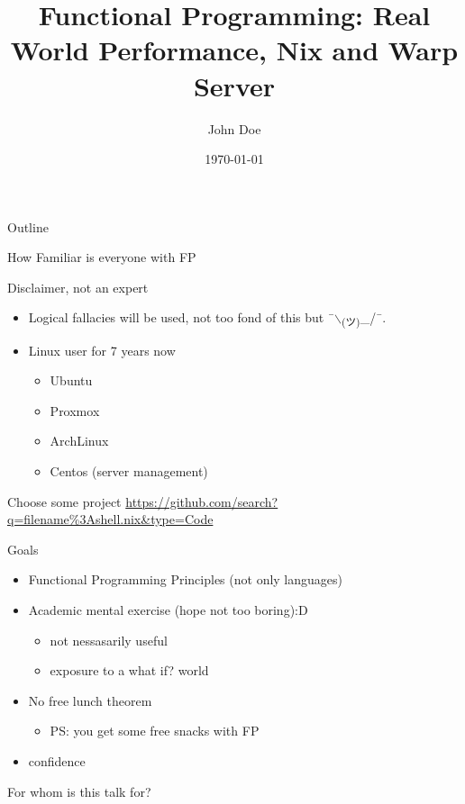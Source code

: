 \documentclass[presentation]{beamer}
\author{John Doe}
\date{\today}
\title{Functional Programming: Real World Performance, Nix and Warp Server}
\begin{document}
\maketitle
\begin{frame}{Outline}
\tableofcontents
\end{frame}

\begin{frame}[label={sec:org583bd86},fragile]{How Familiar is everyone with FP}
 \begin{block}{Disclaimer, not an expert}
\begin{itemize}
\item Logical fallacies will be used, not too fond of this but ¯$\backslash$\textsubscript{(ツ)}\_/¯.
\item Linux user for 7 years now
\begin{itemize}
\item Ubuntu
\item Proxmox
\item ArchLinux
\item Centos (server management)
\end{itemize}
\end{itemize}
\end{block}
\begin{block}{Choose some project}
\url{https://github.com/search?q=filename\%3Ashell.nix\&type=Code}
\end{block}
\begin{block}{Goals}
\begin{itemize}
\item Functional Programming \alert{Principles} (not only languages)
\item Academic mental exercise (hope not too boring):D
\begin{itemize}
\item not nessasarily useful
\item exposure to a \alert{what if?} world
\end{itemize}
\item No free lunch theorem
\begin{itemize}
\item PS: you get some free snacks with FP
\end{itemize}
\item confidence
\end{itemize}
\end{block}
\begin{block}{For whom is this talk for?}
\begin{itemize}

\end{itemize}
\end{block}
\end{frame}
\end{document}
